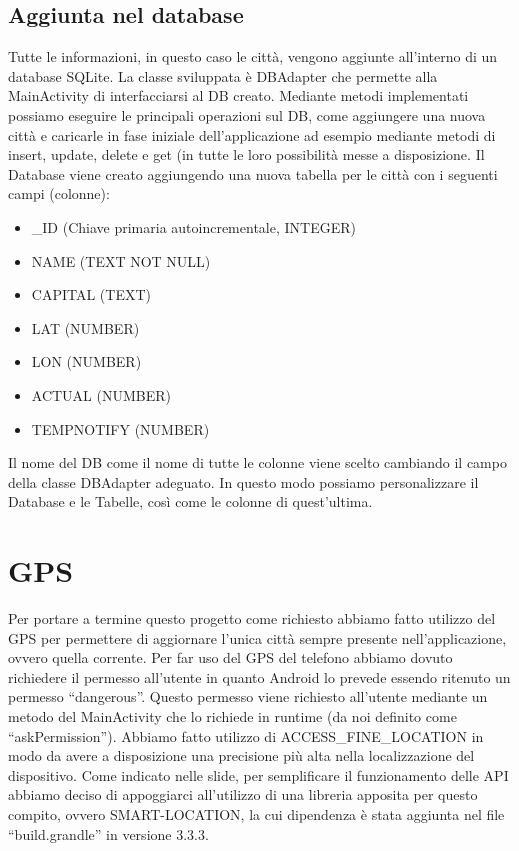 \documentclass[twoside]{supsistudent}
\begin{document}
\subsection{Aggiunta nel database}
Tutte le informazioni, in questo caso le città, vengono aggiunte all’interno di un database SQLite. La classe sviluppata è DBAdapter che permette alla MainActivity di interfacciarsi al DB creato. Mediante metodi implementati possiamo eseguire le principali operazioni sul DB, come aggiungere una nuova città e caricarle in fase iniziale dell’applicazione ad esempio mediante metodi di insert, update, delete e get (in tutte le loro possibilità messe a disposizione.
Il Database viene creato aggiungendo una nuova tabella per le città con i seguenti campi (colonne):
\begin{itemize}
\item \_ID (Chiave primaria autoincrementale, INTEGER)
\item NAME (TEXT NOT NULL)
\item CAPITAL (TEXT)
\item LAT (NUMBER)
\item LON (NUMBER)
\item ACTUAL (NUMBER)
\item TEMPNOTIFY (NUMBER)
\end{itemize}

Il nome del DB come il nome di tutte le colonne viene scelto cambiando il campo della classe DBAdapter adeguato. In questo modo possiamo personalizzare il Database e le Tabelle, così come le colonne di quest’ultima.

\section{GPS}
Per portare a termine questo progetto come richiesto abbiamo fatto utilizzo del GPS per permettere di aggiornare l’unica città sempre presente nell’applicazione, ovvero quella corrente.
Per far uso del GPS del telefono abbiamo dovuto richiedere il permesso all’utente in quanto Android lo prevede essendo ritenuto un permesso “dangerous”. Questo permesso viene richiesto all’utente mediante un metodo del MainActivity che lo richiede in runtime (da noi definito come “askPermission”). Abbiamo fatto utilizzo di ACCESS\_FINE\_LOCATION in modo da avere a disposizione una precisione più alta nella localizzazione del dispositivo. 
Come indicato nelle slide, per semplificare il funzionamento delle API abbiamo deciso di appoggiarci all’utilizzo di una libreria apposita per questo compito, ovvero SMART-LOCATION, la cui dipendenza è stata aggiunta nel file “build.grandle” in versione 3.3.3.
\end{document}
